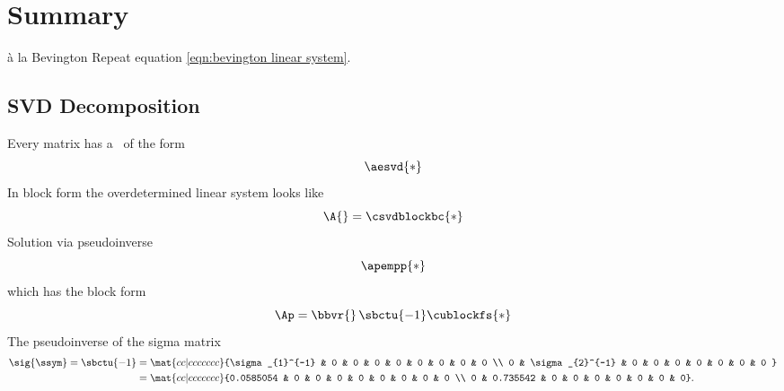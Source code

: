 \section{\label{sec:bevington summary}Summary}

\`a la Bevington
Repeat equation \eqref{eqn:bevington linear system}.

\subsection{SVD Decomposition}
Every matrix has a \asvd \ of the form
  \begin{equation}
      \aesvd{*}
  \end{equation}
In block form the overdetermined linear system looks like
  \begin{equation}
      \A{} = \csvdblockbc{*}
  \end{equation}
Solution via pseudoinverse
  \begin{equation}
      \apempp{*}
  \end{equation}
which has the block form
  \begin{equation}
      \Ap = \bbvr{}\, \sbctu{-1} \cublockfs{ * }
  \end{equation}
The pseudoinverse of the sigma matrix
  \begin{equation}
    \begin{split}
      \sig{\ssym} = \sbctu{-1}
        &= \mat{cc|ccccccc}{\sigma_{1}^{-1} & 0  & 0 & 0 & 0 & 0 & 0 & 0 & 0 \\ 0 & \sigma_{2}^{-1} & 0 & 0 & 0 & 0 & 0 & 0 & 0 } \\
        &= \mat{cc|ccccccc}{0.0585054 & 0 & 0 & 0 & 0 & 0 & 0 & 0 & 0 \\ 0 & 0.735542 & 0 & 0 & 0 & 0 & 0 & 0 & 0}.
    \end{split}
  \end{equation}
